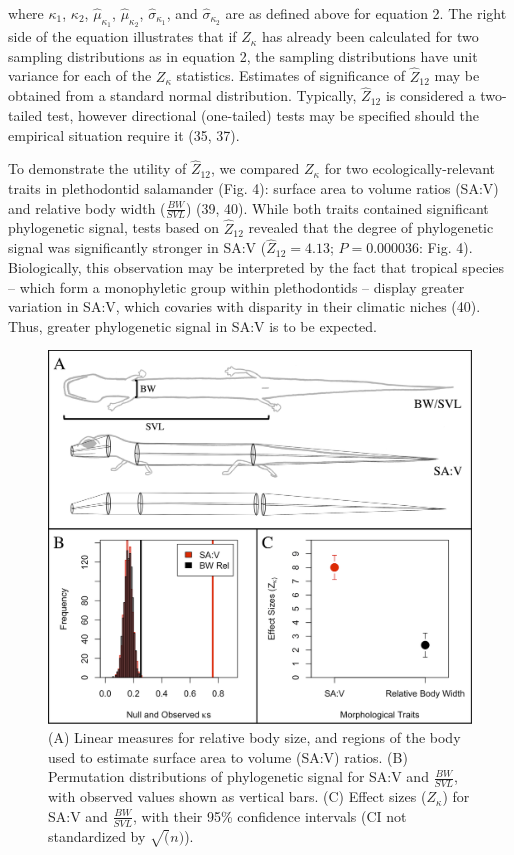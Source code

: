 \documentclass[9pt,twocolumn,twoside,lineno]{pnas-new}
\begin{document}
where \(\kappa_1\), \(\kappa_2\), \(\hat\mu_{\kappa_1}\),
\(\hat\mu_{\kappa_2}\), \(\hat\sigma_{\kappa_1}\), and
\(\hat\sigma_{\kappa_2}\) are as defined above for equation 2. The right
side of the equation illustrates that if \(Z_\kappa\) has already been
calculated for two sampling distributions as in equation 2, the sampling
distributions have unit variance for each of the \(Z_\kappa\)
statistics. Estimates of significance of \(\hat{Z}_{12}\) may be
obtained from a standard normal distribution. Typically,
\(\hat{Z}_{12}\) is considered a two-tailed test, however directional
(one-tailed) tests may be specified should the empirical situation
require it (35, 37).

To demonstrate the utility of \(\hat{Z}_12\), we compared \(Z_{\kappa}\)
for two ecologically-relevant traits in plethodontid salamander (Fig.
4): surface area to volume ratios (SA:V) and relative body width
(\(\frac{BW}{SVL}\)) (39, 40). While both traits contained significant
phylogenetic signal, tests based on \(\hat{Z}_{12}\) revealed that the
degree of phylogenetic signal was significantly stronger in SA:V
(\(\hat{Z}_{12}=4.13\); \(P=0.000036\): Fig. 4). Biologically, this
observation may be interpreted by the fact that tropical species --
which form a monophyletic group within plethodontids -- display greater
variation in SA:V, which covaries with disparity in their climatic
niches (40). Thus, greater phylogenetic signal in SA:V is to be
expected.

\begin{figure}
\centering
\includegraphics{fig.4.png}
\caption{(A) Linear measures for relative body size, and regions of the
body used to estimate surface area to volume (SA:V) ratios. (B)
Permutation distributions of phylogenetic signal for SA:V and
\(\frac{BW}{SVL}\), with observed values shown as vertical bars. (C)
Effect sizes (\(Z_\kappa\)) for SA:V and \(\frac{BW}{SVL}\), with their
95\% confidence intervals (CI not standardized by \(\sqrt(n)\)).{}}
\end{figure}
\end{document}
